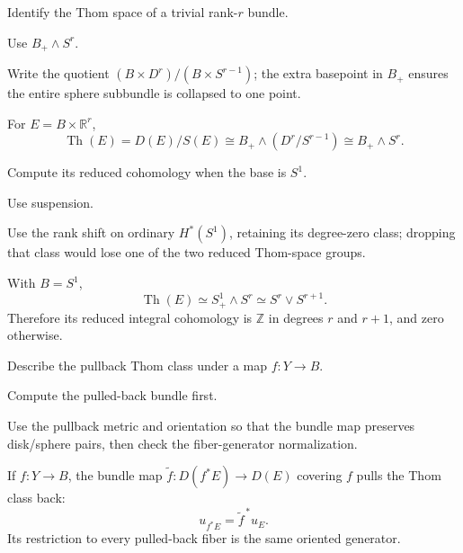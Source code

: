 \begin{exercise}\label{exr:viii31-06}
Identify the Thom space of a trivial rank-$r$ bundle.
\end{exercise}
\begin{hint}
Use $B_+\wedge S^r$.

Write the quotient \((B\times D^r)/(B\times S^{r-1})\); the extra basepoint in \(B_+\) ensures the entire sphere subbundle is collapsed to one point.
\end{hint}
\begin{solution}
For \(E=B\times\mathbb R^r\),
\[
\operatorname{Th}(E)=D(E)/S(E)\cong B_+\wedge(D^r/S^{r-1})
\cong B_+\wedge S^r.
\]
\end{solution}

\begin{exercise}\label{exr:viii31-07}
Compute its reduced cohomology when the base is $S^1$.
\end{exercise}
\begin{hint}
Use suspension.

Use the rank shift on ordinary \(H^*(S^1)\), retaining its degree-zero class; dropping that class would lose one of the two reduced Thom-space groups.
\end{hint}
\begin{solution}
With \(B=S^1\),
\[
\operatorname{Th}(E)\simeq S^1_+\wedge S^r\simeq S^r\vee S^{r+1}.
\]
Therefore its reduced integral cohomology is \(\mathbb Z\) in degrees \(r\) and \(r+1\), and zero otherwise.
\end{solution}

\begin{exercise}\label{exr:viii31-08}
Describe the pullback Thom class under a map $f:Y\to B$.
\end{exercise}
\begin{hint}
Compute the pulled-back bundle first.

Use the pullback metric and orientation so that the bundle map preserves disk/sphere pairs, then check the fiber-generator normalization.
\end{hint}
\begin{solution}
If \(f:Y\to B\), the bundle map \(\widetilde f:D(f^*E)\to D(E)\) covering \(f\) pulls the Thom class back:
\[
u_{f^*E}=\widetilde f^{\,*}u_E.
\]
Its restriction to every pulled-back fiber is the same oriented generator.
\end{solution}

